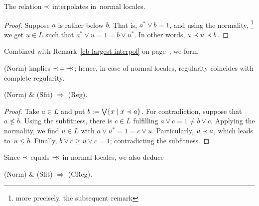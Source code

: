 \begin{lem}
  The relation $\prec$ interpolates in~normal locales.
\end{lem}
\begin{proof}
  Suppose $a$ is rather below $b$.
  That is, $a^* \vee b = 1$, and using the normality,\thinspace%
  \footnote{more precisely, the subsequent remark}
  we get $u\in L$ such that
  $a^* \vee u = 1 = b \vee u^*$.
  In other words, $a \prec u \prec b$.
\end{proof}

Combined with Remark~\ref{cb-largest-interpol} on
page~\pageref{cb-largest-interpol}\thinspace, we form

\begin{cor}
  (Norm) implies $\prec \, = \, \prec\mkern-8mu\prec$;
  hence, in case of normal locales, regularity coincides with complete
  regularity.
\end{cor}

\begin{thm}
  (Norm) $\&$ (Sfit) $\Rightarrow$ (Reg).
\end{thm}
\begin{proof}
  Take $a\in L$ and put $b := \bigvee \{x \mid x \prec a\}$.
  For contradiction, suppose that $a\not\le b$.
  Using the subfitness, there is $c\in L$ fulfilling $a \vee c = 1 \ne b \vee
  c$.
  Applying the normality, we find $u\in L$ with $a \vee u^* = 1 = c \vee u$.
  Particularly, $u \prec a$, which leads to~$u \le b$.
  Finally, $b \vee c \ge u \vee c = 1$; contradicting the subfitness.
\end{proof}

Since $\prec$ equals $\prec\mkern-8mu\prec$ in normal locales, we also deduce

\begin{cor}
  (Norm) $\&$ (Sfit) $\Rightarrow$ (CReg).
\end{cor}
